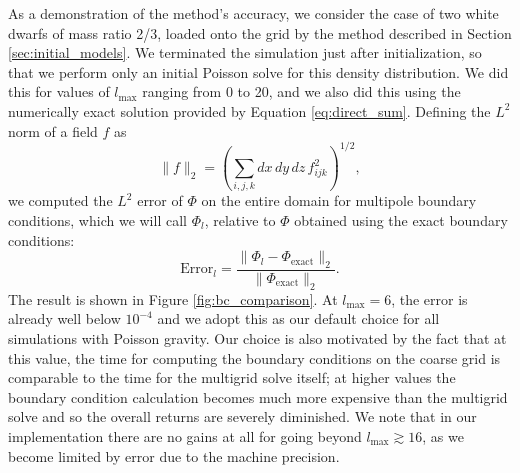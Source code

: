 \documentclass[iop]{emulateapj}
\begin{document}
As a demonstration of the method's accuracy, we consider the case of two 
white dwarfs of mass ratio 2/3, loaded onto the grid by the method described 
in Section \ref{sec:initial_models}. We terminated the simulation just after
initialization, so that we perform only an initial Poisson solve for this 
density distribution. We did this for values of $l_{\text{max}}$ ranging
from 0 to 20, and we also did this using the numerically exact solution 
provided by Equation \ref{eq:direct_sum}.  Defining the $L^2$
norm of a field $f$ as
\begin{equation}
  \| f \|_2 = \left(\sum_{i,j,k} dx\, dy\, dz\, f_{ijk}^2\right)^{1/2},
\end{equation}
we computed the $L^2$ error of $\Phi$ on the entire domain for multipole 
boundary conditions, which we will call $\Phi_l$, relative to $\Phi$ 
obtained using the exact boundary conditions:
\begin{equation}
  \text{Error}_l = \frac{\|\Phi_l - \Phi_{\text{exact}}\|_2}{\|\Phi_{\text{exact}}\|_2}.
\end{equation}
The result is shown in Figure \ref{fig:bc_comparison}. At $l_{\text{max}} = 6$,
the error is already well below $10^{-4}$ and we adopt this as our default 
choice for all simulations with Poisson gravity. Our choice is also motivated by the 
fact that at this value, the time for computing the boundary conditions on the
coarse grid is comparable to the time for the multigrid solve itself; at higher values 
the boundary condition calculation becomes much more expensive than the multigrid solve
and so the overall returns are severely diminished. We note that in our implementation 
there are no gains at all for going beyond $l_{\text{max}} \gtrsim 16$, as we 
become limited by error due to the machine precision.
\end{document}
